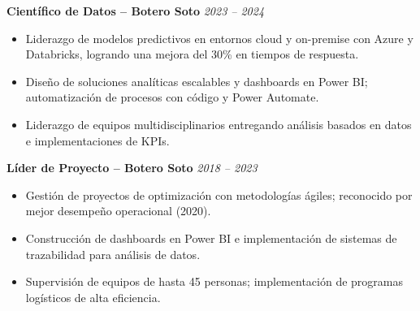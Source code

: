 \vspace{0.1em}

\textbf{Científico de Datos – Botero Soto} \hfill \textit{2023 – 2024} \\[-0.6em]
\begin{itemize}[leftmargin=*]
    \item Liderazgo de modelos predictivos en entornos cloud y on-premise con Azure y Databricks, logrando una mejora del 30\% en tiempos de respuesta.
    \item Diseño de soluciones analíticas escalables y dashboards en Power BI; automatización de procesos con código y Power Automate.
    \item Liderazgo de equipos multidisciplinarios entregando análisis basados en datos e implementaciones de KPIs.
\end{itemize}

\vspace{0.1em}

\textbf{Líder de Proyecto – Botero Soto} \hfill \textit{2018 – 2023} \\[-0.6em]
\begin{itemize}[leftmargin=*]
    \item Gestión de proyectos de optimización con metodologías ágiles; reconocido por mejor desempeño operacional (2020).
    \item Construcción de dashboards en Power BI e implementación de sistemas de trazabilidad para análisis de datos.
    \item Supervisión de equipos de hasta 45 personas; implementación de programas logísticos de alta eficiencia.
\end{itemize}
